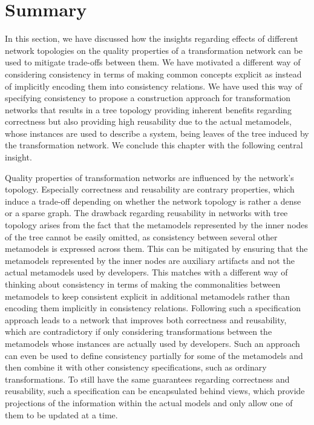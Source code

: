 \section{Summary}

In this section, we have discussed how the insights regarding effects of different network topologies on the quality properties of a transformation network can be used to mitigate trade-offs between them.
We have motivated a different way of considering consistency in terms of making common concepts explicit as \emph{\commonalities} instead of implicitly encoding them into consistency relations.
We have used this way of specifying consistency to propose a construction approach for transformation networks that results in a tree topology providing inherent benefits regarding correctness but also providing high reusability due to the actual metamodels, whose instances are used to describe a system, being leaves of the tree induced by the transformation network.
We conclude this chapter with the following central insight.

\begin{insight}
    Quality properties of transformation networks are influenced by the network's topology.
    Especially correctness and reusability are contrary properties, which induce a trade-off depending on whether the network topology is rather a dense or a sparse graph.
    The drawback regarding reusability in networks with tree topology arises from the fact that the metamodels represented by the inner nodes of the tree cannot be easily omitted, as consistency between several other metamodels is expressed across them.
    This can be mitigated by ensuring that the metamodels represented by the inner nodes are auxiliary artifacts and not the actual metamodels used by developers.
    This matches with a different way of thinking about consistency in terms of making the commonalities between metamodels to keep consistent explicit in additional metamodels rather than encoding them implicitly in consistency relations.
    Following such a specification approach leads to a network that improves both correctness and reusability, which are contradictory if only considering transformations between the metamodels whose instances are actually used by developers.
    Such an approach can even be used to define consistency partially for some of the metamodels and then combine it with other consistency specifications, such as ordinary transformations.
    To still have the same guarantees regarding correctness and reusability, such a specification can be encapsulated behind views, which provide projections of the information within the actual models and only allow one of them to be updated at a time.
\end{insight}